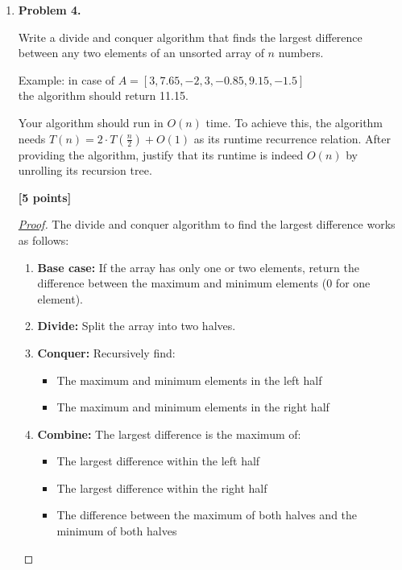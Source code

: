 \documentclass[11pt]{article}
\begin{document}
\begin{enumerate}
\begin{proof}[\underline{Proof}]
$$
O(k) + O(n \log k) = O(n \log k).
$$

\end{proof}


\item \textbf{Problem 4.}

Write a divide and conquer algorithm that finds the largest difference between any two elements of an unsorted array of \(n\) numbers.

Example: in case of \(A = [3, 7.65, -2, 3, -0.85, 9.15, -1.5]\)\\
the algorithm should return 11.15.

Your algorithm should run in \(O(n)\) time. To achieve this, the algorithm needs \(T(n) = 2 \cdot T (\frac{n}{2}) + O(1)\) as its runtime recurrence relation. After providing the algorithm, justify that its runtime is indeed \(O(n)\) by unrolling its recursion tree.

\begin{flushright}
\textbf{[5 points]}
\end{flushright}

\begin{proof}[\underline{Proof}]

The divide and conquer algorithm to find the largest difference works as follows:

\begin{enumerate}[label=\arabic*.]
    \item \textbf{Base case:} If the array has only one or two elements, return the difference between the maximum and minimum elements (0 for one element).
    \item \textbf{Divide:} Split the array into two halves.
    \item \textbf{Conquer:} Recursively find:
    \begin{itemize}
        \item The maximum and minimum elements in the left half
        \item The maximum and minimum elements in the right half
    \end{itemize}
    \item \textbf{Combine:} The largest difference is the maximum of:
    \begin{itemize}
        \item The largest difference within the left half
        \item The largest difference within the right half  
        \item The difference between the maximum of both halves and the minimum of both halves
    \end{itemize}
\end{enumerate}


\end{proof}
\end{enumerate}
\end{document}
